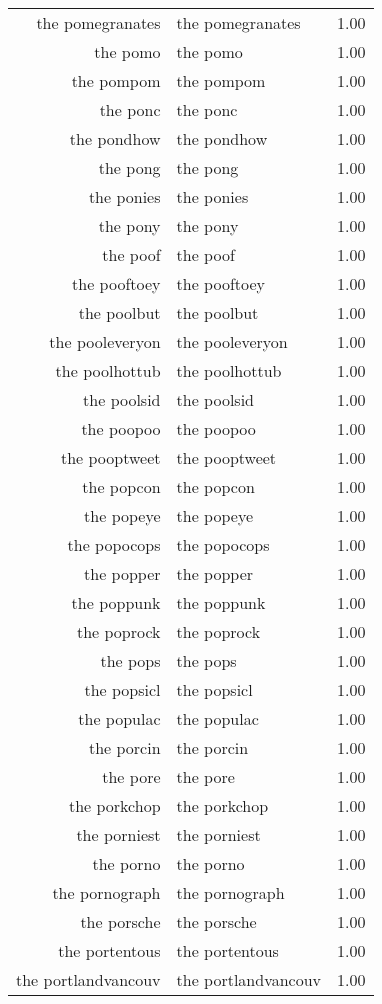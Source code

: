\begin{table}[ht]
\begin{tabular}{rlr}
  the pomegranates & the pomegranates & 1.00 \\ 
  the pomo & the pomo & 1.00 \\ 
  the pompom & the pompom & 1.00 \\ 
  the ponc & the ponc & 1.00 \\ 
  the pondhow & the pondhow & 1.00 \\ 
  the pong & the pong & 1.00 \\ 
  the ponies & the ponies & 1.00 \\ 
  the pony & the pony & 1.00 \\ 
  the poof & the poof & 1.00 \\ 
  the pooftoey & the pooftoey & 1.00 \\ 
  the poolbut & the poolbut & 1.00 \\ 
  the pooleveryon & the pooleveryon & 1.00 \\ 
  the poolhottub & the poolhottub & 1.00 \\ 
  the poolsid & the poolsid & 1.00 \\ 
  the poopoo & the poopoo & 1.00 \\ 
  the pooptweet & the pooptweet & 1.00 \\ 
  the popcon & the popcon & 1.00 \\ 
  the popeye & the popeye & 1.00 \\ 
  the popocops & the popocops & 1.00 \\ 
  the popper & the popper & 1.00 \\ 
  the poppunk & the poppunk & 1.00 \\ 
  the poprock & the poprock & 1.00 \\ 
  the pops & the pops & 1.00 \\ 
  the popsicl & the popsicl & 1.00 \\ 
  the populac & the populac & 1.00 \\ 
  the porcin & the porcin & 1.00 \\ 
  the pore & the pore & 1.00 \\ 
  the porkchop & the porkchop & 1.00 \\ 
  the porniest & the porniest & 1.00 \\ 
  the porno & the porno & 1.00 \\ 
  the pornograph & the pornograph & 1.00 \\ 
  the porsche & the porsche & 1.00 \\ 
  the portentous & the portentous & 1.00 \\ 
  the portlandvancouv & the portlandvancouv & 1.00 \\ 

\end{tabular}
\end{table}

